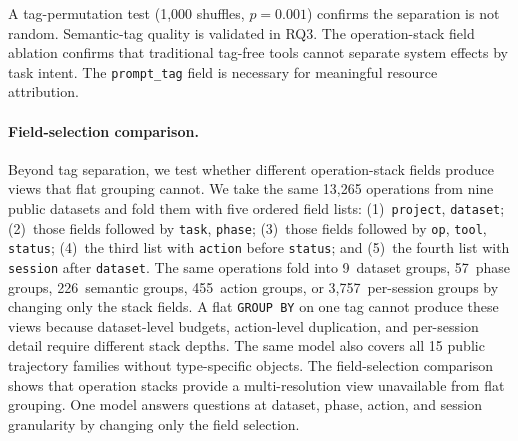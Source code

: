 \documentclass[letterpaper]{article}
\begin{document}
A tag-permutation test (1{,}000 shuffles, $p = 0.001$) confirms the separation is not random.
Semantic-tag quality is validated in RQ3.
The operation-stack field ablation confirms that traditional tag-free tools cannot
separate system effects by task intent. The \texttt{prompt\_tag} field is
necessary for meaningful resource attribution.

\paragraph{Field-selection comparison.}
Beyond tag separation, we test whether different operation-stack fields
produce views that flat grouping cannot.
We take the same 13{,}265 operations from nine public datasets and fold them
with five ordered field lists: (1)~\texttt{project}, \texttt{dataset};
(2)~those fields followed by \texttt{task}, \texttt{phase}; (3)~those fields
followed by \texttt{op}, \texttt{tool}, \texttt{status}; (4)~the third list
with \texttt{action} before \texttt{status}; and (5)~the fourth list with
\texttt{session} after \texttt{dataset}.
The same operations fold into 9~dataset groups, 57~phase groups, 226~semantic groups, 455~action groups, or 3{,}757~per-session groups by changing only the stack fields.
A flat \texttt{GROUP BY} on one tag cannot produce these views because
dataset-level budgets, action-level duplication, and per-session detail require
different stack depths.
The same model also covers all 15 public trajectory families without type-specific objects.
The field-selection comparison shows that operation stacks provide a
multi-resolution view unavailable from flat grouping. One model answers
questions at dataset, phase, action, and session granularity by changing only
the field selection.
\end{document}
